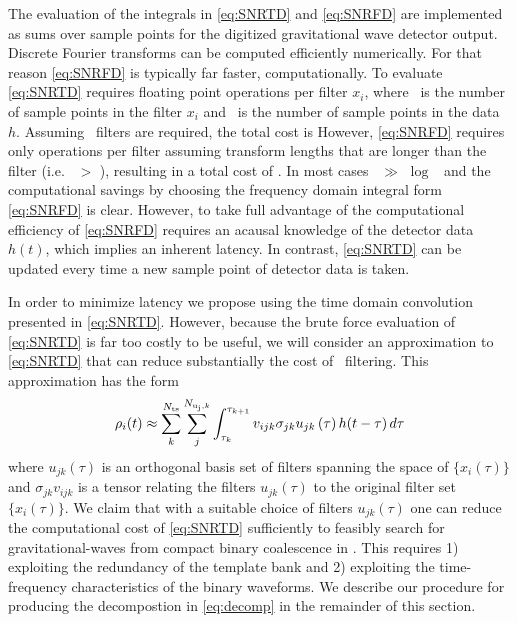 The evaluation of the integrals in \eqref{eq:SNRTD} and \eqref{eq:SNRFD} are
implemented as sums over sample points for the digitized gravitational wave
detector output.  Discrete Fourier transforms can be computed efficiently
numerically.  For that reason \eqref{eq:SNRFD} is typically far faster,
computationally.  To evaluate \eqref{eq:SNRTD} requires \order{\tmpsamps
\hoftsamps} floating point operations per filter $x_i$, where \tmpsamps\ is the
number of sample points in the filter $x_i$ and \hoftsamps\ is the number of
sample points in the data $h$.  Assuming \numtmps\ filters are required, the
total cost is \order{\numtmps \tmpsamps \hoftsamps} However, \eqref{eq:SNRFD}
requires only \order{\hoftsamps \log \hoftsamps} operations per filter assuming
transform lengths that are longer than the filter (i.e. \hoftsamps\ $>$
\tmpsamps), resulting in a total cost of \order{\numtmps \hoftsamps \log
\hoftsamps}.  In most cases \tmpsamps\ $\gg$ $\log$ \hoftsamps\ and the
computational savings by choosing the frequency domain integral form
\eqref{eq:SNRFD} is clear.  However, to take full advantage of the
computational efficiency of \eqref{eq:SNRFD} requires an acausal knowledge of
the detector data $h(t)$, which implies an inherent latency.  In contrast,
\eqref{eq:SNRTD} can be updated every time a new sample point of detector data
is taken.  

In order to minimize latency we propose using the time domain convolution
presented in \eqref{eq:SNRTD}.  However, because the brute force evaluation of
\eqref{eq:SNRTD} is far too costly to be useful, we will consider an
approximation to \eqref{eq:SNRTD} that can reduce substantially the cost of
\realtime\ filtering. This approximation has the form
%
%
\begin{equation}
\rho_i(t) \approx \sum_k^{{N}_{\mathrm{ts}}} \sum_j^{N_{\mathrm{u_j},k}} 
	\int_{\tau_{k}}^{\tau_{k+1}} v_{ijk} \sigma_{jk} u_{jk}\,(\tau) \, h(t-\tau) \, d \tau \label{eq:decomp}
\end{equation} 
%
%
where $u_{jk}(\tau)$ is an orthogonal basis set of filters spanning the space
of $\{x_i(\tau)\}$ and $\sigma_{jk} v_{ijk}$ is a tensor relating the filters
$u_{jk}(\tau)$ to the original filter set $\{x_i(\tau)\}$.  We claim that with
a suitable choice of filters $u_{jk}(\tau)$ one can reduce the computational
cost of \eqref{eq:SNRTD} sufficiently to feasibly search for
gravitational-waves from compact binary coalescence in \realtime.  This
requires 1) exploiting the redundancy of the template bank and 2) exploiting
the time-frequency characteristics of the binary waveforms.  We describe our
procedure for producing the decompostion in \eqref{eq:decomp} in the remainder
of this section.

